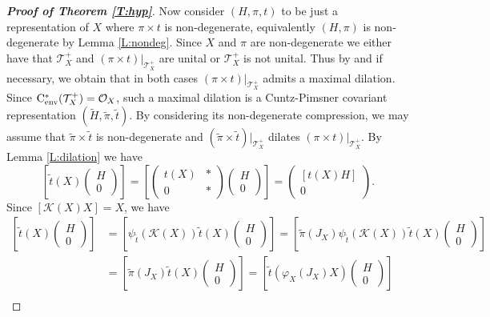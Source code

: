 \documentclass[11pt, draft]{amsart}
\numberwithin{equation}{section}
\theoremstyle{plain}
\theoremstyle{definition}
\theoremstyle{remark}
\newcommand{\K}{{\mathcal{K}}}
\renewcommand{\O}{{\mathcal{O}}}
\newcommand{\T}{{\mathcal{T}}}
\newcommand\vphi{\varphi}
\newcommand{\cenv}{\mathrm{C}^*_{\textup{env}}}
\newcommand{\wt}{\widetilde}
\begin{document}
\begin{proof}[{\bf Proof of Theorem \ref{T:hyp}}]
Now consider $(H,\pi, t)$ to be just a  representation of $X$ where $\pi\times t$ is non-degenerate, equivalently $(H,\pi)$ is non-degenerate by Lemma \ref{L:nondeg}.
Since $X$ and $\pi$ are non-degenerate we either have that $\T_X^+$ and $(\pi \times t)|_{\T_X^+}$ are unital or $\T_X^+$ is not unital. Thus by \cite[Theorem 1.2]{DM05} and \cite[Proposition 2.5]{DS18} if necessary, we obtain that in both cases $(\pi \times t)|_{\T_X^+}$ admits a maximal dilation. 
Since $\cenv(\T_X^+)=\O_X$, such a maximal dilation is a Cuntz-Pimsner covariant representation $(\wt{H},\wt{\pi},\wt{t})$. 
By considering its non-degenerate compression, we may assume that $\wt{\pi}\times \wt{t}$ is non-degenerate and $(\wt{\pi} \times \wt{t})|_{\T_X^+}$ dilates $(\pi \times t)|_{\T_X^+}$.
By Lemma \ref{L:dilation} we have
\[
\left[\wt{t}(X) \begin{pmatrix} H \\ 0 \end{pmatrix}
\right]
=
\left[\begin{pmatrix} t(X) & * \\  0 & * \end{pmatrix}
\begin{pmatrix} H \\ 0 \end{pmatrix}\right]
=
\begin{pmatrix} [t(X)H] \\  0 \end{pmatrix}.
\]
Since $[\K(X) X] = X$, we have
\begin{align*}
\left[\wt{t}(X) \begin{pmatrix} H \\ 0 \end{pmatrix} \right]
& =
\left[\psi_{\wt{t}}(\K(X))\wt{t}(X) \begin{pmatrix} H \\ 0 \end{pmatrix} \right] 
=
\left[\wt{\pi}(J_X) \psi_{\wt{t}}(\K(X)) \wt{t}(X) \begin{pmatrix} H \\ 0 \end{pmatrix} \right] \\
& =
\left[\wt{\pi}(J_X) \wt{t}(X) \begin{pmatrix} H \\ 0 \end{pmatrix} \right] 
=
\left[\wt{t}(\vphi_X(J_X)X) \begin{pmatrix} H \\ 0 \end{pmatrix} \right] \\

\end{align*}
\end{proof}
\end{document}

